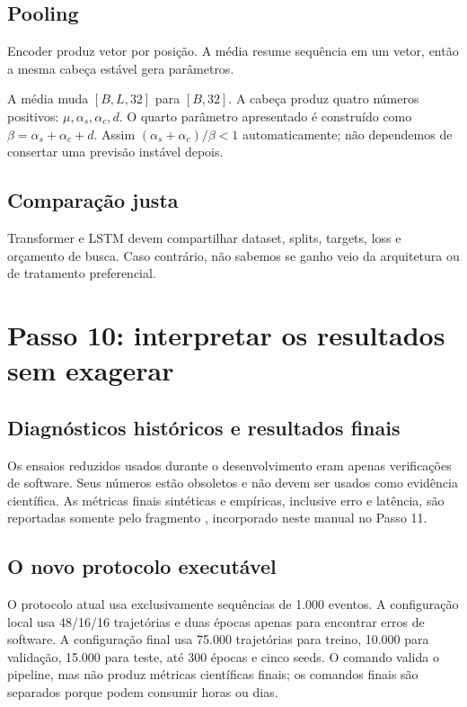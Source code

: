 \documentclass[12pt,a4paper,openany]{report}
\begin{document}
\section{Pooling}

Encoder produz vetor por posição. A média resume sequência em um vetor, então a mesma
cabeça estável gera parâmetros.

A média muda \([B,L,32]\) para \([B,32]\). A cabeça produz quatro números positivos:
\(\mu,\alpha_s,\alpha_c,d\). O quarto parâmetro apresentado é construído como
\(\beta=\alpha_s+\alpha_c+d\). Assim
\((\alpha_s+\alpha_c)/\beta<1\) automaticamente; não dependemos de consertar uma
previsão instável depois.

\section{Comparação justa}

Transformer e LSTM devem compartilhar dataset, splits, targets, loss e orçamento
de busca. Caso contrário, não sabemos se ganho veio da arquitetura ou de tratamento
preferencial.

\chapter{Passo 10: interpretar os resultados sem exagerar}

\section{Diagnósticos históricos e resultados finais}

Os ensaios reduzidos usados durante o desenvolvimento eram apenas verificações de
software. Seus números estão obsoletos e não devem ser usados como evidência
científica. As métricas finais sintéticas e empíricas, inclusive erro e latência,
são reportadas somente pelo fragmento
, incorporado neste manual no Passo 11.

\section{O novo protocolo executável}

O protocolo atual usa exclusivamente sequências de 1.000 eventos. A configuração
local usa 48/16/16 trajetórias e duas épocas apenas para encontrar erros de software.
A configuração final usa 75.000 trajetórias para treino, 10.000 para validação,
15.000 para teste, até 300 épocas e cinco seeds. O comando  valida
o pipeline, mas não produz métricas científicas finais; os comandos finais são
separados porque podem consumir horas ou dias.
\end{document}

